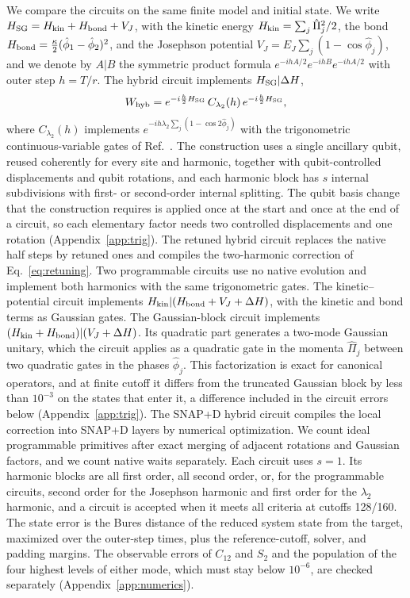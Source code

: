 \documentclass[pra,twocolumn,superscriptaddress,nofootinbib,floatfix]{revtex4-2}
\theoremstyle{remark}
\newcommand{\revcolor}{\color{blue}}
\DeclareRobustCommand{\rev}[1]{{\revcolor #1}}
\begin{document}
\rev{We compare the circuits on the same finite model and initial state.} \rev{We write \(H_{\rm SG}=H_{\rm kin}+H_{\rm bond}+V_J\), with the kinetic energy \(H_{\rm kin}=\sum_j\hat\Pi_j^2/2\), the bond \(H_{\rm bond}=\tfrac{\kappa}{2}(\hat\phi_1-\hat\phi_2)^2\), and the Josephson potential \(V_J=E_J\sum_j(1-\cos\hat\phi_j)\), and we denote by \(A|B\) the symmetric product formula \(e^{-ihA/2}e^{-ihB}e^{-ihA/2}\) with outer step \(h=T/r\).} \rev{The hybrid circuit implements \(H_{\rm SG}|\Delta H\),}
\begingroup\revcolor
\begin{align}
W_{\rm hyb}=e^{-i\frac h2H_{\rm SG}}\,C_{\lambda_2}(h)\,e^{-i\frac h2H_{\rm SG}},
\end{align}
\endgroup
\rev{where \(C_{\lambda_2}(h)\) implements \(e^{-ih\lambda_2\sum_j(1-\cos2\hat\phi_j)}\) with the trigonometric continuous-variable gates of Ref.~\cite{Rainaldi2026TrigonometricCV}.} \rev{The construction uses a single ancillary qubit, reused coherently for every site and harmonic, together with qubit-controlled displacements and qubit rotations, and each harmonic block has \(s\) internal subdivisions with first- or second-order internal splitting.} \rev{The qubit basis change that the construction requires is applied once at the start and once at the end of a circuit, so each elementary factor needs two controlled displacements and one rotation (Appendix~\ref{app:trig}).} \rev{The retuned hybrid circuit replaces the native half steps by retuned ones and compiles the two-harmonic correction of Eq.~\eqref{eq:retuning}.} \rev{Two programmable circuits use no native evolution and implement both harmonics with the same trigonometric gates.} \rev{The kinetic--potential circuit implements \(H_{\rm kin}|(H_{\rm bond}+V_J+\Delta H)\), with the kinetic and bond terms as Gaussian gates.} \rev{The Gaussian-block circuit implements \((H_{\rm kin}+H_{\rm bond})|(V_J+\Delta H)\).} \rev{Its quadratic part generates a two-mode Gaussian unitary, which the circuit applies as a quadratic gate in the momenta \(\hat\Pi_j\) between two quadratic gates in the phases \(\hat\phi_j\).} \rev{This factorization is exact for canonical operators, and at finite cutoff it differs from the truncated Gaussian block by less than \(10^{-3}\) on the states that enter it, a difference included in the circuit errors below (Appendix~\ref{app:trig}).} \rev{The SNAP+D hybrid circuit compiles the local correction into SNAP+D layers by numerical optimization.} \rev{We count ideal programmable primitives after exact merging of adjacent rotations and Gaussian factors, and we count native waits separately.} \rev{Each circuit uses \(s=1\).} \rev{Its harmonic blocks are all first order, all second order, or, for the programmable circuits, second order for the Josephson harmonic and first order for the \(\lambda_2\) harmonic, and a circuit is accepted when it meets all criteria at cutoffs 128/160.} \rev{The state error is the Bures distance of the reduced system state from the target, maximized over the outer-step times, plus the reference-cutoff, solver, and padding margins.} \rev{The observable errors of \(C_{12}\) and \(S_2\) and the population of the four highest levels of either mode, which must stay below \(10^{-6}\), are checked separately (Appendix~\ref{app:numerics}).}
\end{document}

